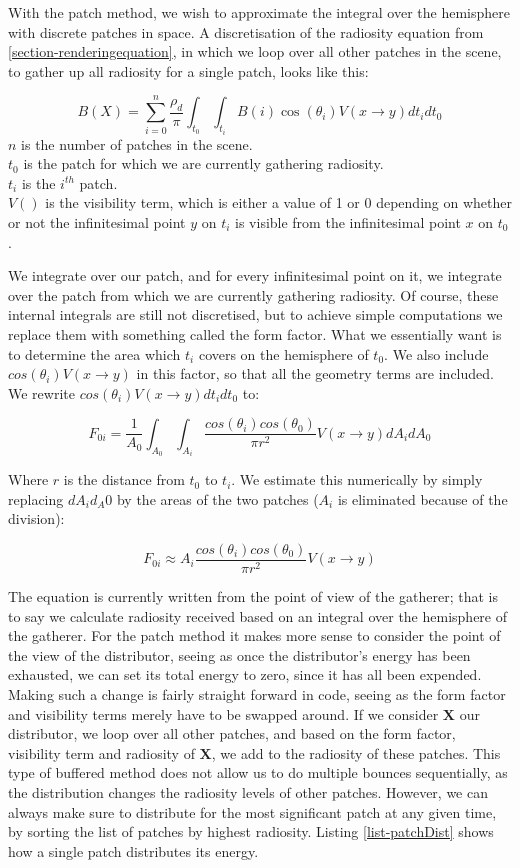With the patch method, we wish to approximate the integral over the hemisphere with discrete patches in space. A discretisation of the radiosity equation from \ref{section-renderingequation}, in which we loop over all other patches in the scene, to gather up all radiosity for a single patch, looks like this:

$$B(X) = \sum_{i=0}^{n} \frac{\rho_d}{\pi} \int_{t_0} \int_{t_i} B(i) \cos(\theta_i) V(x \rightarrow y) dt_i dt_0$$
$n$ is the number of patches in the scene.\\
$t_0$ is the patch for which we are currently gathering radiosity.\\
$t_i$ is the $i^{th}$ patch.\\
$V()$ is the visibility term, which is either a value of 1 or 0 depending on whether or not the infinitesimal point $y$ on $t_i$ is visible from the infinitesimal point $x$ on $t_0$.

We integrate over our patch, and for every infinitesimal point on it, we integrate over the patch from which we are currently gathering radiosity. Of course, these internal integrals are still not discretised, but to achieve simple computations we replace them with something called the form factor. What we essentially want is to determine the area which $t_i$ covers on the hemisphere of $t_0$. We also include $cos(\theta_i) V(x \rightarrow y)$ in this factor, so that all the geometry terms are included. We rewrite $cos(\theta_i) V(x \rightarrow y)dt_i dt_0$ to:\cite{radiosity}

$$F_{0i} = \frac{1}{A_0} \int_{A_0} \int_{A_i} \frac{cos(\theta_i) cos(\theta_0)}{\pi r^2}  V(x \rightarrow y) dA_i dA_0$$

Where $r$ is the distance from $t_0$ to $t_i$. We estimate this numerically by simply replacing $dA_i d_A0$ by the areas of the two patches ($A_i$ is eliminated because of the division):

$$F_{0i} \approx A_i \frac{cos(\theta_i) cos(\theta_0)}{\pi r^2}  V(x \rightarrow y)$$

The equation is currently written from the point of view of the gatherer; that is to say we calculate radiosity received based on an integral over the hemisphere of the gatherer. For the patch method it makes more sense to consider the point of the view of the distributor, seeing as once the distributor's energy has been exhausted, we can set its total energy to zero, since it has all been expended. Making such a change is fairly straight forward in code, seeing as the form factor and visibility terms merely have to be swapped around. If we consider $\mathbf{X}$ our distributor, we loop over all other patches, and based on the form factor, visibility term and radiosity of $\mathbf{X}$, we add to the radiosity of these patches. This type of buffered method does not allow us to do multiple bounces sequentially, as the distribution changes the radiosity levels of other patches. However, we can always make sure to distribute for the most significant patch at any given time, by sorting the list of patches by highest radiosity. Listing \ref{list-patchDist} shows how a single patch distributes its energy.

